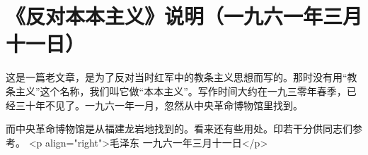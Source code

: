 \section{《反对本本主义》说明（一九六一年三月十一日）}


这是一篇老文章，是为了反对当时红军中的教条主义思想而写的。那时没有用“教条主义”这个名称，我们叫它做“本本主义”。写作时间大约在一九三零年春季，已经三十年不见了。一九六一年一月，忽然从中央革命博物馆里找到。

而中央革命博物馆是从福建龙岩地找到的。看来还有些用处。印若干分供同志们参考。
<p align="right">毛泽东
一九六一年三月十一日</p>


